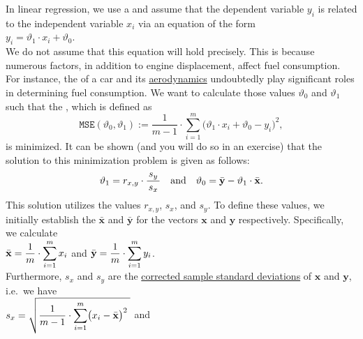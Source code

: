 In linear regression, we use a  
and assume that the dependent variable $y_i$ is related to the independent variable $x_i$ via an
equation of the form
\\[0.2cm]
\hspace*{1.3cm}
$y_i = \vartheta_1 \cdot x_i + \vartheta_0$.
\\[0.2cm]
We do not assume that this equation will hold precisely. This is because numerous factors, in addition to
engine displacement, affect fuel consumption. For instance, the  of a car and its
\href{https://en.wikipedia.org/wiki/Automotive_aerodynamics}{aerodynamics} undoubtedly play significant roles
in determining fuel consumption. 
We want to calculate those values $\vartheta_0$ and $\vartheta_1$ such that the 
,  which is defined as 
\begin{equation}
  \label{eq:mse}
 \mathtt{MSE}(\vartheta_0, \vartheta_1) := \frac{1}{m-1} \cdot \sum\limits_{i=1}^m \bigl(\vartheta_1 \cdot x_i + \vartheta_0 - y_i\bigr)^2,
\end{equation}
is minimized.  It can be shown (and you will do so in an exercise) that the solution to this minimization
problem is given as follows: 
\begin{equation}
  \label{eq:theta0}
  \displaystyle \vartheta_1 = r_{x,y} \cdot \frac{\,s_y\,}{s_x} \quad \mbox{and} \quad
      \vartheta_0 = \bar{\mathbf{y}} - \vartheta_1 \cdot \bar{\mathbf{x}}.
\end{equation}
This solution utilizes the values $r_{x,y}$, $s_x$, and $s_y$. To define these values, we initially establish
the   $\bar{\mathbf{x}}$ and $\bar{\mathbf{y}}$ for the
vectors $\mathbf{x}$ and $\mathbf{y}$ respectively. Specifically, we calculate 
\\[0.2cm]
\hspace*{1.3cm}
$\displaystyle \bar{\mathbf{x}} = \frac{1}{m} \cdot \sum_{i=1}^m x_i$ \quad and \quad
$\displaystyle \bar{\mathbf{y}} = \frac{1}{m} \cdot \sum_{i=1}^m y_i$.
\\[0.2cm]
Furthermore, $s_x$ and $s_y$ are the \href{https://en.wikipedia.org/wiki/Standard_deviation#Sample_standard_deviation}{corrected sample standard deviations} 
of $\mathbf{x}$ and $\mathbf{y}$, i.e.~we have
\\[0.2cm]
\hspace*{1.3cm}
$\displaystyle s_x = \sqrt{\frac{1}{m-1} \cdot \sum\limits_{i=1}^m \bigl(x_i - \bar{\mathbf{x}}\bigr)^2\;}$ \quad and \quad
